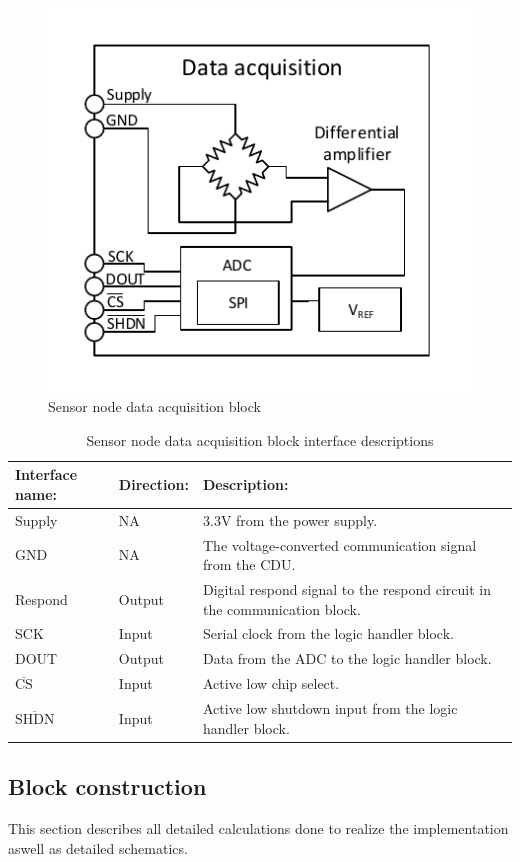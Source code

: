 \begin{figure}[H]
	\centering
	\includegraphics[width=.5\textwidth]{billeder/data_aqcuisition_sn}
	\caption{Sensor node data acquisition block}
	\label{fig:sn_data_acquisition}
\end{figure}

\begin{table}[H]
	\centering
	\begin{tabular}{|p{3cm} |p{2cm} | p{8cm}| }
		\hline
		Interface name: 			& Direction: 	& Description: \\ \hline
		Supply						& NA			& 3.3V from the power supply. \\ \hline
		GND							& NA			& The voltage-converted communication signal from the CDU.\\ \hline
		Respond		  				& Output		& Digital respond signal to the respond circuit in the communication block. \\ \hline
		SCK							& Input			& Serial clock from the logic handler block.\\\hline
		DOUT						& Output		& Data from the ADC to the logic handler block.\\\hline
		$\overline{\text{CS}}$		& Input			& Active low chip select.\\\hline
		$\overline{\text{SHDN}}$	& Input			& Active low shutdown input from the logic handler block.\\\hline
	\end{tabular}
	\caption{Sensor node data acquisition block interface descriptions}
\end{table}


\subsection{Block construction}
This section describes all detailed calculations done to realize the implementation aswell as detailed schematics.\\

